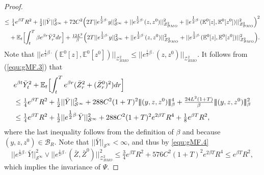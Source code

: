 \documentclass[10pt,a4paper]{article}
\theoremstyle{plain}
\theoremstyle{definition}
\numberwithin{equation}{section}
\newcommand{\trinm}[1]{\vert\!\vert\!\vert #1 \vert\!\vert\!\vert}
\begin{document}
\begin{proof}
\begin{align}
\leq & \ \tfrac{1}{4}e^{\beta T}R^{2} + \tfrac{1}{2}||\bar{Y}||_{\mathcal{S}^{\infty}}^{2} + 72C^{2}\Bigl(2T||e^{\tfrac{1}{2}\beta\cdot}y||_{\mathcal{S}^{\infty}}^{2} + ||e^{\tfrac{1}{2}\beta\cdot}(z,z^{0})||_{\mathcal{Z}_{BMO}^{2}}^{2} + ||e^{\tfrac{1}{2}\beta\cdot}(\mathbb{E}^{0}[z],\mathbb{E}^{0}[z^{0}])||_{\mathcal{Z}_{BMO}^{2}}^{2}\Bigr)^{2} \nonumber \\
& +\mathbb{E}_{t}\Bigl[\int_{t}^{T}\beta e^{\beta r}\bar{Y}_{r}^{2}dr\Bigr] + \tfrac{12L^{2}}{\beta}\Bigl(2T||e^{\tfrac{1}{2}\beta\cdot}y||_{\mathcal{S}^{\infty}}^{2} + ||e^{\tfrac{1}{2}\beta\cdot}(z,z^{0})||_{\mathcal{Z}_{BMO}^{2}}^{2} + ||e^{\tfrac{1}{2}\beta\cdot}(\mathbb{E}^{0}[z],\mathbb{E}^{0}[z^{0}])||_{\mathcal{Z}_{BMO}^{2}}^{2}\Bigr). \label{equ:gMF.3}
\end{align}
\noindent
Note that
$||e^{\tfrac{1}{2}\beta\cdot}(\mathbb{E}^{0}[z],\mathbb{E}^{0}[z^{0}])||_{\mathcal{Z}_{BMO}^{2}} \leq ||e^{\tfrac{1}{2}\beta\cdot}(z,z^{0})||_{\mathcal{Z}_{BMO}^{2}}.$
It follows from (\ref{equ:gMF.3}) that
\begin{align}
&e^{\beta t}\bar{Y}_{t}^{2} + \mathbb{E}_{t}\Bigl[\int_{t}^{T}e^{\beta r}(\bar{Z}_{r}^{2}+(\bar{Z}_{r}^{0})^{2})dr\Bigr] \nonumber \\
&\leq \tfrac{1}{4}e^{\beta T}R^{2} + \tfrac{1}{2}||\bar{Y}||_{\mathcal{S}^{\infty}}^{2} + 288C^{2}(1+T)^{2}\trinm{(y,z,z^{0})}_\beta^{4} + \tfrac{24L^{2}(1+T)}{\beta}\trinm{(y,z,z^{0})}_\beta^{2} \nonumber \\
&\leq \tfrac{1}{4}e^{\beta T}R^{2} + \tfrac{1}{2}||e^{\tfrac{1}{2}\beta\cdot}\bar{Y}||_{\mathcal{S}^{\infty}}^{2} + 288C^{2}(1+T)^{2}e^{2\beta T}R^{4} + \tfrac{1}{8}e^{\beta T}R^{2} \label{equ:gMF.4},
\end{align}
where the last inequality follows from the definition of $\beta$ and because $(y,z,z^{0}) \in \mathcal{B}_{R}$. Note that $||\bar{Y}||_{\mathcal{S}^{\infty}} < \infty$, and thus by \eqref{equ:gMF.4} 
\begin{equation}
\label{gMF.5}
||e^{\tfrac{1}{2}\beta\cdot}\bar{Y}||_{\mathcal{S}^{\infty}}^{2} \vee ||e^{\tfrac{1}{2}\beta\cdot}(\bar{Z},\bar{Z}^{0})||_{\mathcal{Z}_{BMO}^{2}}^{2} \leq \tfrac{3}{4}e^{\beta T}R^{2} + 576C^{2}(1+T)^{2}e^{2\beta T}R^{4} \leq e^{\beta T}R^{2},
\end{equation}
which implies the invariance of $\Psi.$

\end{proof}
\end{document}
